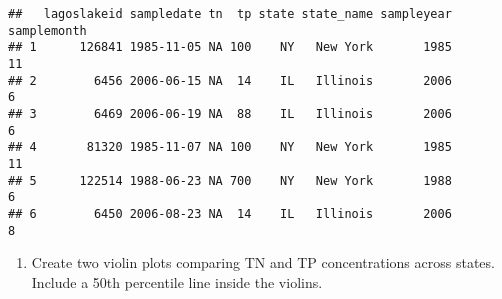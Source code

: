 \documentclass[]{article}
\providecommand{\tightlist}{%
  \setlength{\itemsep}{0pt}\setlength{\parskip}{0pt}}
\begin{document}
\begin{verbatim}
##   lagoslakeid sampledate tn  tp state state_name sampleyear samplemonth
## 1      126841 1985-11-05 NA 100    NY   New York       1985          11
## 2        6456 2006-06-15 NA  14    IL   Illinois       2006           6
## 3        6469 2006-06-19 NA  88    IL   Illinois       2006           6
## 4       81320 1985-11-07 NA 100    NY   New York       1985          11
## 5      122514 1988-06-23 NA 700    NY   New York       1988           6
## 6        6450 2006-08-23 NA  14    IL   Illinois       2006           8
\end{verbatim}

\begin{enumerate}
\def\labelenumi{\arabic{enumi}.}
\setcounter{enumi}{8}
\tightlist
\item
  Create two violin plots comparing TN and TP concentrations across
  states. Include a 50th percentile line inside the violins.
\end{enumerate}
\end{document}
